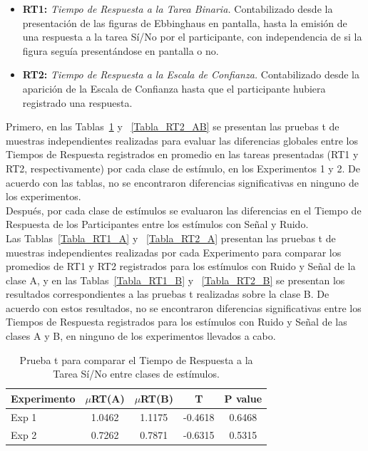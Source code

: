 \begin{itemize}
\item \textbf{RT1:} \textit{Tiempo de Respuesta a la Tarea Binaria.}  Contabilizado desde la presentación de las figuras de Ebbinghaus en pantalla, hasta la emisión de una respuesta a la tarea Sí/No por el participante, con independencia de si la figura seguía presentándose en pantalla o no.\\

\item \textbf{RT2:} \textit{Tiempo de Respuesta a la Escala de Confianza.} Contabilizado desde la aparición de la Escala de Confianza hasta que el participante hubiera registrado una respuesta.\\
\end{itemize}

Primero, en las Tablas~\ref{Tabla_RT1_AB} y ~\ref{Tabla_RT2_AB} se presentan las pruebas t de muestras independientes realizadas para evaluar las diferencias globales entre los Tiempos de Respuesta registrados en promedio en las tareas presentadas (RT1 y RT2, respectivamente) por cada clase de estímulo, en los Experimentos 1 y 2. De acuerdo con las tablas, no se encontraron diferencias significativas en ninguno de los experimentos.\\

Después, por cada clase de estímulos se evaluaron las diferencias en el Tiempo de Respuesta de los Participantes entre los estímulos con Señal y Ruido.\\

Las Tablas~\ref{Tabla_RT1_A} y ~\ref{Tabla_RT2_A} presentan las pruebas t de muestras independientes realizadas por cada Experimento para comparar los promedios de RT1 y RT2 registrados para los estímulos con Ruido y Señal de la clase A, y en las Tablas~\ref{Tabla_RT1_B} y ~\ref{Tabla_RT2_B} se presentan los resultados correspondientes a las pruebas t realizadas sobre la clase B. De acuerdo con estos resultados, no se encontraron diferencias significativas entre los Tiempos de Respuesta registrados para los estímulos con Ruido y Señal de las clases A y B, en ninguno de los experimentos llevados a cabo.\\



\begin{table}
\caption[Tiempo de Respuesta a la tarea Sí/No por clase de estímulo]{Prueba t para comparar el Tiempo de Respuesta a la Tarea Sí/No entre clases de estímulos.}
\label{Tabla_RT1_AB}
\centering
\begin{tabular}{l |  c c c c}
\toprule
\textbf{Experimento} & \textbf{$\mu$RT(A)} & \textbf{$\mu$RT(B)} & \textbf{T} & \textbf{P value}\\
\midrule
Exp 1 & 1.0462 & 1.1175 & -0.4618 & 0.6468 \\
Exp 2 & 0.7262 & 0.7871 & -0.6315 & 0.5315 \\
\bottomrule
\end{tabular}
\end{table}

